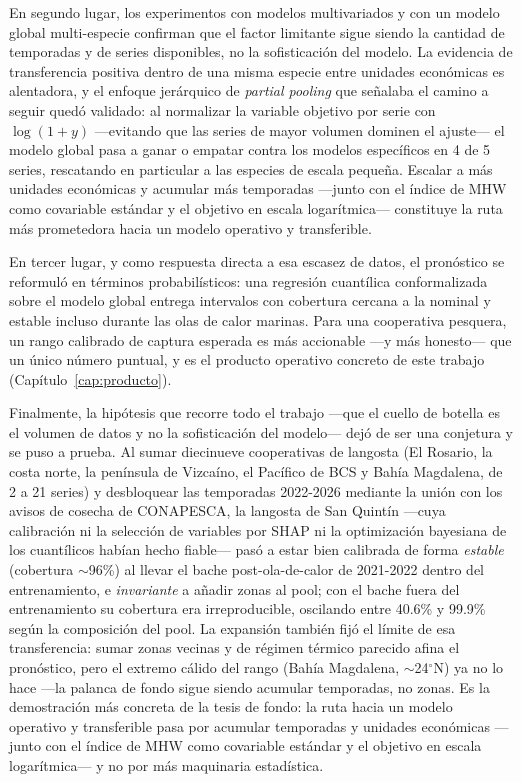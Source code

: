 En segundo lugar, los experimentos con modelos multivariados y con un modelo global multi-especie confirman que el factor limitante sigue siendo la cantidad de temporadas y de series disponibles, no la sofisticación del modelo. La evidencia de transferencia positiva dentro de una misma especie entre unidades económicas es alentadora, y el enfoque jerárquico de \emph{partial pooling} que señalaba el camino a seguir quedó validado: al normalizar la variable objetivo por serie con $\log(1+y)$ —evitando que las series de mayor volumen dominen el ajuste— el modelo global pasa a ganar o empatar contra los modelos específicos en 4 de 5 series, rescatando en particular a las especies de escala pequeña. Escalar a más unidades económicas y acumular más temporadas —junto con el índice de MHW como covariable estándar y el objetivo en escala logarítmica— constituye la ruta más prometedora hacia un modelo operativo y transferible.

En tercer lugar, y como respuesta directa a esa escasez de datos, el pronóstico se reformuló en términos probabilísticos: una regresión cuantílica conformalizada sobre el modelo global entrega intervalos con cobertura cercana a la nominal y estable incluso durante las olas de calor marinas. Para una cooperativa pesquera, un rango calibrado de captura esperada es más accionable ---y más honesto--- que un único número puntual, y es el producto operativo concreto de este trabajo (Capítulo~\ref{cap:producto}).

Finalmente, la hipótesis que recorre todo el trabajo ---que el cuello de botella es el volumen de datos y no la sofisticación del modelo--- dejó de ser una conjetura y se puso a prueba. Al sumar diecinueve cooperativas de langosta (El Rosario, la costa norte, la península de Vizcaíno, el Pacífico de BCS y Bahía Magdalena, de 2 a 21 series) y desbloquear las temporadas 2022-2026 mediante la unión con los avisos de cosecha de CONAPESCA, la langosta de San Quintín ---cuya calibración ni la selección de variables por SHAP ni la optimización bayesiana de los cuantílicos habían hecho fiable--- pasó a estar bien calibrada de forma \emph{estable} (cobertura $\sim$96\%) al llevar el bache post-ola-de-calor de 2021-2022 dentro del entrenamiento, e \emph{invariante} a añadir zonas al pool; con el bache fuera del entrenamiento su cobertura era irreproducible, oscilando entre 40.6\% y 99.9\% según la composición del pool. La expansión también fijó el límite de esa transferencia: sumar zonas vecinas y de régimen térmico parecido afina el pronóstico, pero el extremo cálido del rango (Bahía Magdalena, $\sim$24$^\circ$N) ya no lo hace ---la palanca de fondo sigue siendo acumular temporadas, no zonas. Es la demostración más concreta de la tesis de fondo: la ruta hacia un modelo operativo y transferible pasa por acumular temporadas y unidades económicas ---junto con el índice de MHW como covariable estándar y el objetivo en escala logarítmica--- y no por más maquinaria estadística.

